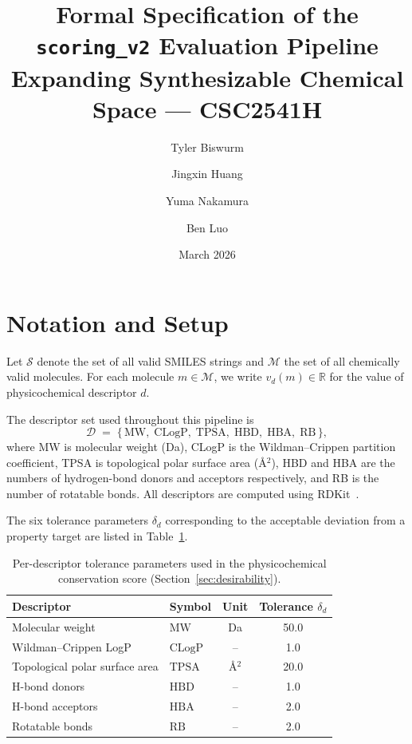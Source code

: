 \documentclass[11pt, a4paper]{article}
\title{%
  \textbf{Formal Specification of the \texttt{scoring\_v2} Evaluation Pipeline}\\[0.5ex]
  \large Expanding Synthesizable Chemical Space --- CSC2541H
}
\author{Tyler Biswurm \and Jingxin Huang \and Yuma Nakamura \and Ben Luo}
\date{March 2026}
\theoremstyle{definition}
\newcommand{\1}[1]{\mathbf{1}\!\left[#1\right]}   %
\newcommand{\Desc}{\mathcal{D}}                     %
\begin{document}
\maketitle
\tableofcontents
\bigskip

\section{Notation and Setup}
\label{sec:notation}

Let $\mathcal{S}$ denote the set of all valid SMILES strings and
$\mathcal{M}$ the set of all chemically valid molecules.
For each molecule $m \in \mathcal{M}$, we write $v_d(m) \in \mathbb{R}$
for the value of physicochemical descriptor $d$.

The descriptor set used throughout this pipeline is
\[
  \Desc \;=\; \{\,\text{MW},\; \text{CLogP},\; \text{TPSA},\;
                  \text{HBD},\; \text{HBA},\; \text{RB}\,\},
\]
where MW is molecular weight (Da), CLogP is the Wildman--Crippen
partition coefficient, TPSA is topological polar surface area (\AA$^2$),
HBD and HBA are the numbers of hydrogen-bond donors and acceptors
respectively, and RB is the number of rotatable bonds.
All descriptors are computed using RDKit~\cite{rdkit}.

The six tolerance parameters $\delta_d$ corresponding to the acceptable
deviation from a property target are listed in Table~\ref{tab:tolerances}.

\begin{table}[h]
\centering
\caption{Per-descriptor tolerance parameters used in the physicochemical
         conservation score (Section~\ref{sec:desirability}).}
\label{tab:tolerances}
\begin{tabular}{llcc}
\toprule
Descriptor & Symbol & Unit & Tolerance $\delta_d$ \\
\midrule
Molecular weight           & $\text{MW}$   & Da   & 50.0 \\
Wildman--Crippen LogP      & $\text{CLogP}$& --   & 1.0  \\
Topological polar surface area & $\text{TPSA}$ & \AA$^2$ & 20.0 \\
H-bond donors              & $\text{HBD}$  & --   & 1.0  \\
H-bond acceptors           & $\text{HBA}$  & --   & 2.0  \\
Rotatable bonds            & $\text{RB}$   & --   & 2.0  \\
\bottomrule
\end{tabular}
\end{table}
\end{document}
